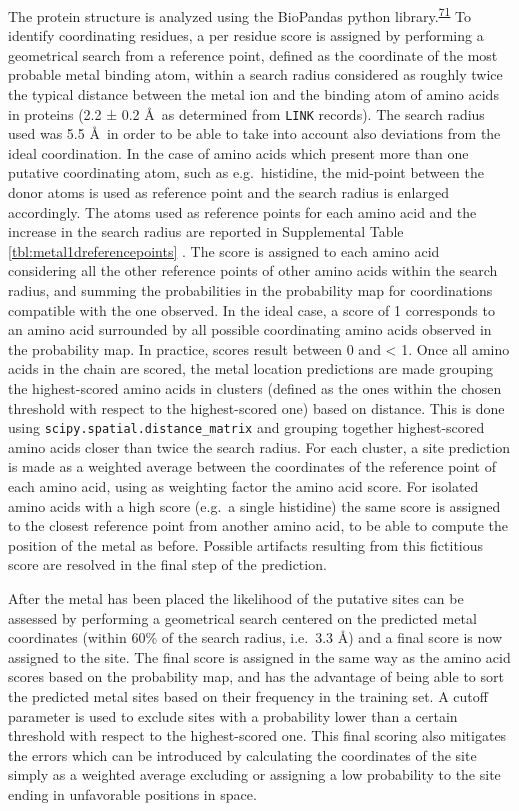 \documentclass[  ASAPversion,
  ,
  9pt]{elife}
\begin{document}
The protein structure is analyzed using the BioPandas python library.\textsuperscript{\protect\hyperlink{ref-CcRTAd7h}{71}} To identify coordinating residues, a per residue score is assigned by performing a geometrical search from a reference point, defined as the coordinate of the most probable metal binding atom, within a search radius considered as roughly twice the typical distance between the metal ion and the binding atom of amino acids in proteins (2.2 ± 0.2 \AA\, as determined from \texttt{LINK} records). The search radius used was 5.5 \AA\, in order to be able to take into account also deviations from the ideal coordination. In the case of amino acids which present more than one putative coordinating atom, such as e.g.~histidine, the mid-point between the donor atoms is used as reference point and the search radius is enlarged accordingly. The atoms used as reference points for each amino acid and the increase in the search radius are reported in Supplemental Table \ref{tbl:metal1dreferencepoints} .
The score is assigned to each amino acid considering all the other reference points of other amino acids within the search radius, and summing the probabilities in the probability map for coordinations compatible with the one observed. In the ideal case, a score of 1 corresponds to an amino acid surrounded by all possible coordinating amino acids observed in the probability map. In practice, scores result between 0 and \textless{} 1. Once all amino acids in the chain are scored, the metal location predictions are made grouping the highest-scored amino acids in clusters (defined as the ones within the chosen threshold with respect to the highest-scored one) based on distance. This is done using \texttt{scipy.spatial.distance\_matrix} and grouping together highest-scored amino acids closer than twice the search radius. For each cluster, a site prediction is made as a weighted average between the coordinates of the reference point of each amino acid, using as weighting factor the amino acid score. For isolated amino acids with a high score (e.g.~a single histidine) the same score is assigned to the closest reference point from another amino acid, to be able to compute the position of the metal as before. Possible artifacts resulting from this fictitious score are resolved in the final step of the prediction.

After the metal has been placed the likelihood of the putative sites can be assessed by performing a geometrical search centered on the predicted metal coordinates (within 60\% of the search radius, i.e.~3.3 \AA ) and a final score is now assigned to the site. The final score is assigned in the same way as the amino acid scores based on the probability map, and has the advantage of being able to sort the predicted metal sites based on their frequency in the training set. A cutoff parameter is used to exclude sites with a probability lower than a certain threshold with respect to the highest-scored one. This final scoring also mitigates the errors which can be introduced by calculating the coordinates of the site simply as a weighted average excluding or assigning a low probability to the site ending in unfavorable positions in space.
\end{document}
